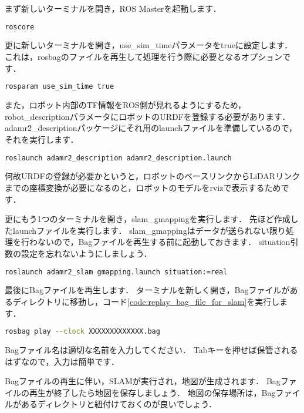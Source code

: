 \documentclass[{../../master}]{subfiles}
\begin{document}
まず新しいターミナルを開き，ROS Masterを起動します．

\begin{lstlisting}[language=sh, caption=Execute \textsf{roscore}]
roscore
\end{lstlisting}

更に新しいターミナルを開き，\textsf{use\_sim\_time}パラメータをtrueに設定します．
これは，\textsf{rosbag}のファイルを再生して処理を行う際に必要となるオプションです．

\begin{lstlisting}[language=sh, caption=Set \textsf{use\_sim\_time} to true]
rosparam use_sim_time true
\end{lstlisting}

また，ロボット内部のTF情報をROS側が見れるようにするため，\textsf{robot\_description}パラメータにロボットのURDFを登録する必要があります．
\textsf{adamr2\_description}パッケージにそれ用のlaunchファイルを準備しているので，それを実行します．

\begin{lstlisting}[language=sh, caption=Launch \textsf{adamr2\_description.launch}]
roslaunch adamr2_description adamr2_description.launch
\end{lstlisting}

\noindent
何故URDFの登録が必要かというと，ロボットのベースリンクからLiDARリンクまでの座標変換が必要になるのと，ロボットのモデルを\textsf{rviz}で表示するためです．

更にもう1つのターミナルを開き，\textsf{slam\_gmapping}を実行します．
先ほど作成したlaunchファイルを実行します．
\textsf{slam\_gmapping}はデータが送られない限り処理を行わないので，Bagファイルを再生する前に起動しておきます．
\textsf{situation}引数の設定を忘れないようにしましょう．

\begin{lstlisting}[language=sh, caption=Run \textsf{gmapping.launch}]
roslaunch adamr2_slam gmapping.launch situation:=real
\end{lstlisting}

最後にBagファイルを再生します．
ターミナルを新しく開き，Bagファイルがあるディレクトリに移動し，コード\ref{code:replay_bag_file_for_slam}を実行します．

\begin{lstlisting}[language=sh, label=code:replay_bag_file_for_slam, caption=Replay \textsf{slam.bag}]
rosbag play --clock XXXXXXXXXXXXX.bag
\end{lstlisting}

Bagファイル名は適切な名前を入力してください．
\textsf{Tab}キーを押せば保管されるはずなので，入力は簡単です．

Bagファイルの再生に伴い，SLAMが実行され，地図が生成されます．
Bagファイルの再生が終了したら地図を保存しましょう．
地図の保存場所は，Bagファイルがあるディレクトリと紐付けておくのが良いでしょう．
\end{document}
